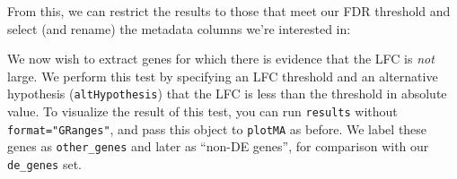 \documentclass[
]{article}
\newenvironment{Shaded}{}{}
\newcommand{\DataTypeTok}[1]{\textcolor[rgb]{0.56,0.13,0.00}{#1}}
\newcommand{\DecValTok}[1]{\textcolor[rgb]{0.25,0.63,0.44}{#1}}
\newcommand{\FloatTok}[1]{\textcolor[rgb]{0.25,0.63,0.44}{#1}}
\newcommand{\KeywordTok}[1]{\textcolor[rgb]{0.00,0.44,0.13}{\textbf{#1}}}
\newcommand{\NormalTok}[1]{#1}
\newcommand{\OperatorTok}[1]{\textcolor[rgb]{0.40,0.40,0.40}{#1}}
\newcommand{\StringTok}[1]{\textcolor[rgb]{0.25,0.44,0.63}{#1}}
\begin{document}
From this, we can restrict the results to those that meet our FDR threshold and
select (and rename) the metadata columns we're interested in:

\begin{Shaded}
\end{Shaded}

We now wish to extract genes for which there is evidence that the LFC is \emph{not}
large. We perform this test by specifying an LFC threshold and an alternative
hypothesis (\texttt{altHypothesis}) that the LFC is less than the threshold in
absolute value. To visualize the result of this test, you can run \texttt{results}
without \texttt{format="GRanges"}, and pass this object to \texttt{plotMA} as before. We
label these genes as \texttt{other\_genes} and later as ``non-DE genes'', for comparison
with our \texttt{de\_genes} set.

\begin{Shaded}
\end{Shaded}
\end{document}
